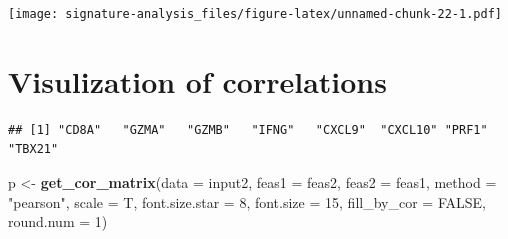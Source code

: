 \documentclass[
  12pt,
]{book}
\newenvironment{Shaded}{\begin{snugshade}}{\end{snugshade}}
\newcommand{\AttributeTok}[1]{\textcolor[rgb]{0.13,0.29,0.53}{#1}}
\newcommand{\ConstantTok}[1]{\textcolor[rgb]{0.56,0.35,0.01}{#1}}
\newcommand{\DecValTok}[1]{\textcolor[rgb]{0.00,0.00,0.81}{#1}}
\newcommand{\FunctionTok}[1]{\textcolor[rgb]{0.13,0.29,0.53}{\textbf{#1}}}
\newcommand{\NormalTok}[1]{#1}
\newcommand{\OtherTok}[1]{\textcolor[rgb]{0.56,0.35,0.01}{#1}}
\newcommand{\SpecialCharTok}[1]{\textcolor[rgb]{0.81,0.36,0.00}{\textbf{#1}}}
\newcommand{\StringTok}[1]{\textcolor[rgb]{0.31,0.60,0.02}{#1}}
\begin{document}
\texttt{[image: signature-analysis\_files/figure-latex/unnamed-chunk-22-1.pdf]}

\hypertarget{visulization-of-correlations}{%
\section{Visulization of correlations}\label{visulization-of-correlations}}

\begin{Shaded}
\end{Shaded}

\begin{verbatim}
## [1] "CD8A"   "GZMA"   "GZMB"   "IFNG"   "CXCL9"  "CXCL10" "PRF1"   "TBX21"
\end{verbatim}

\begin{Shaded}
\begin{Highlighting}[]
\NormalTok{p }\OtherTok{\textless{}{-}} \FunctionTok{get\_cor\_matrix}\NormalTok{(}\AttributeTok{data           =}\NormalTok{ input2, }
                    \AttributeTok{feas1          =}\NormalTok{ feas2, }
                    \AttributeTok{feas2          =}\NormalTok{ feas1,}
                    \AttributeTok{method         =} \StringTok{"pearson"}\NormalTok{,}
                    \AttributeTok{scale          =}\NormalTok{ T, }
                    \AttributeTok{font.size.star =} \DecValTok{8}\NormalTok{, }
                    \AttributeTok{font.size      =} \DecValTok{15}\NormalTok{, }
                    \AttributeTok{fill\_by\_cor    =} \ConstantTok{FALSE}\NormalTok{, }
                    \AttributeTok{round.num      =} \DecValTok{1}\NormalTok{)}
\end{Highlighting}
\end{Shaded}
\end{document}
